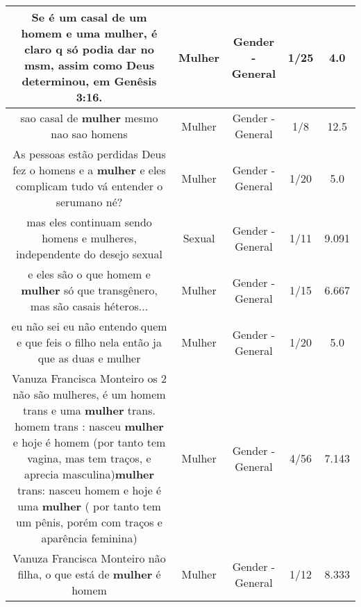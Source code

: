 \documentclass[11pt]{article}
\newlength\mylength
\begin{document}
\begin{center}
\begin{longtable}{|C{.65\mylength}|C{.30\mylength}|C{.12\mylength}|C{.12\mylength}|C{.12\mylength}|}
  \small Se é um casal de um homem e uma \textbf{mulher}, é claro q só podia dar no msm, assim como Deus determinou, em Genêsis 3:16.\normalsize   & Mulher & Gender - General & 1/25 & 4.0 \\  \hline
  \small sao  casal  de  \textbf{mulher}  mesmo  nao sao  homens\normalsize   & Mulher & Gender - General & 1/8 & 12.5 \\  \hline
  \small As pessoas estão perdidas Deus fez o homens e a \textbf{mulher}  e eles complicam tudo  vá entender o serumano né?\normalsize   & Mulher & Gender - General & 1/20 & 5.0 \\  \hline
  \small mas eles continuam sendo homens e mulheres, independente do desejo sexual\normalsize   & Sexual & Gender - General & 1/11 & 9.091 \\  \hline
  \small e eles são o que homem e \textbf{mulher} só que transgênero, mas são casais héteros...\normalsize   & Mulher & Gender - General & 1/15 & 6.667 \\  \hline
  \small eu não sei eu não entendo quem e que feis o filho nela então ja que as duas e mulher\normalsize   & Mulher & Gender - General & 1/20 & 5.0 \\  \hline
  \small Vanuza Francisca Monteiro os 2 não são mulheres, é um homem trans e uma \textbf{mulher} trans. homem trans : nasceu \textbf{mulher} e hoje é homem (por tanto tem vagina, mas tem traços, e aprecia masculina)\textbf{mulher} trans: nasceu homem e hoje é uma \textbf{mulher} ( por tanto tem um pênis, porém com traços e aparência feminina)\normalsize   & Mulher & Gender - General & 4/56 & 7.143 \\  \hline
  \small Vanuza Francisca Monteiro não filha, o que está de \textbf{mulher} é homem\normalsize   & Mulher & Gender - General & 1/12 & 8.333 \\  \hline

\end{longtable}
\end{center}
\end{document}
